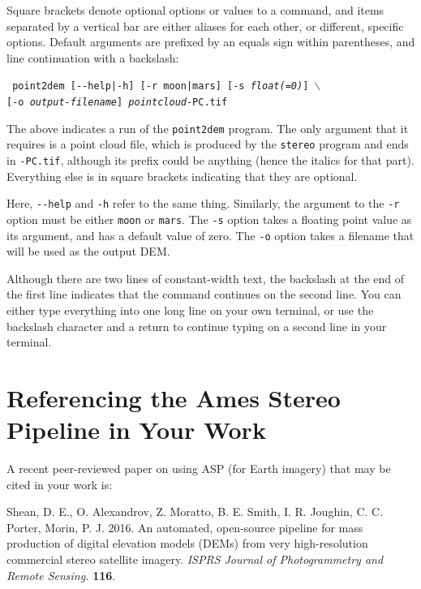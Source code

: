 Square brackets denote optional options or values to a command, and
items separated by a vertical bar are either aliases for each other, or
different, specific options.  Default arguments are prefixed by an equals
sign within parentheses, and line continuation with a backslash:

\texttt{  point2dem [-\/-help|-h] [-r moon|mars] [-s \textit{float(=0)}] $\backslash$ } \\
\hspace*{6em}\texttt{[-o \textit{output-filename}] \textit{pointcloud}-PC.tif}

The above indicates a run of the \texttt{point2dem} program.  The
only argument that it requires is a point cloud file, which is
produced by the \texttt{stereo} program and ends in \texttt{-PC.tif},
although its prefix could be anything (hence the italics for that
part).  Everything else is in square brackets indicating that they
are optional.

Here, \texttt{-\/-help} and \texttt{-h} refer to the same
thing. Similarly, the argument to the \texttt{-r} option must be either
\texttt{moon} or \texttt{mars}.  The \texttt{-s} option takes a floating
point value as its argument, and has a default value of zero.  The
\texttt{-o} option takes a filename that will be used as the output
\ac{DEM}.

Although there are two lines of constant-width text, the backslash at
the end of the first line indicates that the command continues on the
second line. You can either type everything into one long line on your
own terminal, or use the backslash character and a return to continue
typing on a second line in your terminal.


\section{Referencing the Ames Stereo Pipeline in Your Work}

A recent peer-reviewed paper on using ASP (for Earth imagery) that 
may be cited in your work is:

\begin{description}
\item Shean, D. E., O. Alexandrov, Z. Moratto, B. E. Smith, I. R. Joughin, C. C. Porter, Morin, P. J. 2016.  An automated, open-source pipeline for mass production of digital elevation models (DEMs) from very high-resolution commercial stereo satellite imagery. 
\textit{ISPRS Journal of Photogrammetry and Remote Sensing.} 
\textbf{116}.
\end{description}

